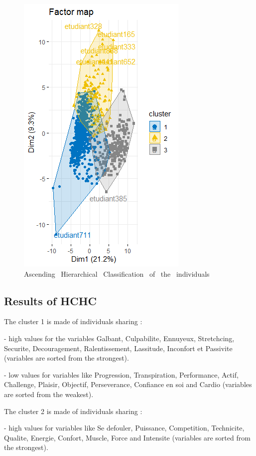 \documentclass[12pt]{article}
\begin{document}
\begin{figure}[H]
\begin{center}
\includegraphics[scale=0.8]{hcpc.png} 
\caption[]{Ascending \ Hierarchical \ Classification \ of \ the \ individuals }
\end{center}
\end{figure}


\subsection{Results of HCHC} 

The cluster 1 is made of individuals sharing :

- high values for the variables  Galbant, Culpabilite, Ennuyeux, 
Stretchcing, Securite, Decouragement, Ralentissement, Lassitude,
Inconfort et Passivite (variables are sorted from the strongest).

- low values for variables like Progression, Transpiration, Performance,
Actif, Challenge, Plaisir, Objectif, Perseverance, Confiance en soi and Cardio 
(variables are sorted from the weakest).


The cluster 2 is made of individuals sharing :


-	high values for variables like Se defouler, Puissance, Competition, Technicite, Qualite, Energie, Confort, Muscle, Force and Intensite (variables are sorted from the strongest).
\end{document}

